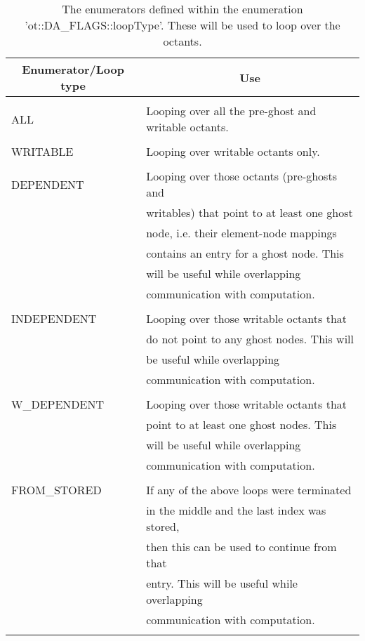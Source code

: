 \documentclass[10pt,reqno,a4paper]{report}
\numberwithin{equation}{section}
\begin{document}
\begin{table}
	\centering
		\begin{tabular}{|l|l|}\hline
		\multicolumn{1}{|c}{Enumerator/Loop type} & \multicolumn{1}{|c|}{Use}\\\hline
									 &\\
		  ALL    			 & Looping over all the pre-ghost and writable octants.\\
		  						 &\\
      WRITABLE     & Looping over writable octants only.\\
      					   &\\
      DEPENDENT    & Looping over those octants (pre-ghosts and\\
      						 & writables) that point to at least one ghost\\
      						 & node, i.e. their element-node mappings\\
      						 & contains an entry for a ghost node. This\\
      						 & will be useful while overlapping\\
      						 & communication with computation.\\
      						 &\\
      INDEPENDENT  & Looping over those writable octants that\\
      						 & do not point to any ghost nodes. This will\\
      						 & be useful while overlapping\\
      						 & communication with computation.\\
      						 &\\
      W\_DEPENDENT & Looping over those writable octants that\\
      						 & point to at least one ghost nodes. This\\
      						 & will be useful while overlapping\\
      						 & communication with computation.\\
      						 &\\
      FROM\_STORED & If any of the above loops were terminated\\
      						 & in the middle and the last index was stored,\\
      						 & then this can be used to continue from that\\
      						 & entry. This will be useful while overlapping\\
      						 & communication with computation.\\
      						 &\\\hline
		\end{tabular}
\caption{The enumerators defined within the enumeration 'ot::DA\_FLAGS::loopType'. These will be used to loop over the octants.}
\label{tab:loopTypes}
\end{table}
\end{document}
